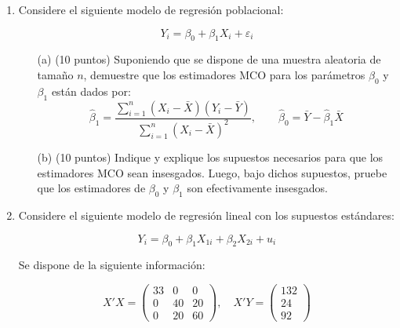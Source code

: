 \documentclass{article} %
\begin{document}
{\begin{enumerate}
El modelo verdadero (sin errores de medición) es:
\[
Y_i = \beta_0 + \beta_1 X_i + \varepsilon_i
\]

Compare los estimadores de Mínimos Cuadrados Ordinarios (MCO) obtenidos utilizando los datos observados \((Y_i^*, X_i^*)\) versus aquellos que se obtendrían si se observaran las variables verdaderas \((Y_i, X_i)\), en una muestra de tamaño n. Analice el efecto que tienen los errores de medición en la estimación de los parámetros del modelo.




\item Considere el siguiente modelo de regresión poblacional:

\[
Y_i = \beta_0 + \beta_1 X_i + \varepsilon_i
\]

\begin{enumerate}
    \item[(a)] (10 puntos) Suponiendo que se dispone de una muestra aleatoria de tamaño \( n \), demuestre que los estimadores  MCO para los parámetros \( \beta_0 \) y \( \beta_1 \) están dados por:
    \[
    \hat{\beta}_1 = \frac{\sum_{i=1}^{n}(X_i - \bar{X})(Y_i - \bar{Y})}{\sum_{i=1}^{n}(X_i - \bar{X})^2}, \qquad
    \hat{\beta}_0 = \bar{Y} - \hat{\beta}_1 \bar{X}
    \]

    \item[(b)] (10 puntos) Indique y explique los supuestos necesarios para que los estimadores MCO sean insesgados. Luego, bajo dichos supuestos, pruebe que los estimadores de \( \beta_0 \) y \( \beta_1 \) son efectivamente insesgados.
\end{enumerate}

\vspace{0.5cm}




    \item Considere el siguiente modelo de regresión lineal con los supuestos estándares:

    \[
    Y_i = \beta_0 + \beta_1 X_{1i} + \beta_2 X_{2i} + u_i
    \]
    
    Se dispone de la siguiente información:
    
    \[
    X'X = \begin{pmatrix}
    33 & 0 & 0 \\
    0 & 40 & 20 \\
    0 & 20 & 60
    \end{pmatrix}, \quad
    X'Y = \begin{pmatrix}
    132 \\
    24 \\
    92
    \end{pmatrix}
    \]
    

\end{enumerate}}
\end{document}
